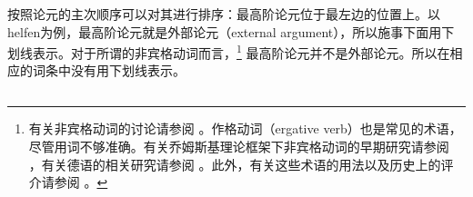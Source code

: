 按照论元的主次顺序可以对其进行排序：最高阶论元位于最左边的位置上。以helfen为例，最高阶论元就是外部论元（external argument），所以施事下面用下划线表示。对于所谓的非宾格动词而言，\footnote{%
有关非宾格动词的讨论请参阅 。作格动词（ergative verb）也是常见的术语，尽管用词不够准确。有关乔姆斯基理论框架下非宾格动词的早期研究请参阅 ，有关德语的相关研究请参阅 。此外，有关这些术语的用法以及历史上的评介请参阅 。
}
最高阶论元并不是外部论元。所以在相应的词条中没有用下划线表示。

\subsection{\xbartc}
\label{Abschnitt-X-Bar}

